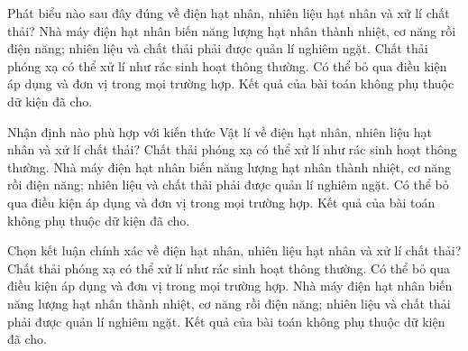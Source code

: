 \begin{ex}
Phát biểu nào sau đây đúng về điện hạt nhân, nhiên liệu hạt nhân và xử lí chất thải?
\choice
{\True Nhà máy điện hạt nhân biến năng lượng hạt nhân thành nhiệt, cơ năng rồi điện năng; nhiên liệu và chất thải phải được quản lí nghiêm ngặt.}
{Chất thải phóng xạ có thể xử lí như rác sinh hoạt thông thường.}
{Có thể bỏ qua điều kiện áp dụng và đơn vị trong mọi trường hợp.}
{Kết quả của bài toán không phụ thuộc dữ kiện đã cho.}
\end{ex}

\begin{ex}
Nhận định nào phù hợp với kiến thức Vật lí về điện hạt nhân, nhiên liệu hạt nhân và xử lí chất thải?
\choice
{Chất thải phóng xạ có thể xử lí như rác sinh hoạt thông thường.}
{\True Nhà máy điện hạt nhân biến năng lượng hạt nhân thành nhiệt, cơ năng rồi điện năng; nhiên liệu và chất thải phải được quản lí nghiêm ngặt.}
{Có thể bỏ qua điều kiện áp dụng và đơn vị trong mọi trường hợp.}
{Kết quả của bài toán không phụ thuộc dữ kiện đã cho.}
\end{ex}

\begin{ex}
Chọn kết luận chính xác về điện hạt nhân, nhiên liệu hạt nhân và xử lí chất thải?
\choice
{Chất thải phóng xạ có thể xử lí như rác sinh hoạt thông thường.}
{Có thể bỏ qua điều kiện áp dụng và đơn vị trong mọi trường hợp.}
{\True Nhà máy điện hạt nhân biến năng lượng hạt nhân thành nhiệt, cơ năng rồi điện năng; nhiên liệu và chất thải phải được quản lí nghiêm ngặt.}
{Kết quả của bài toán không phụ thuộc dữ kiện đã cho.}
\end{ex}

